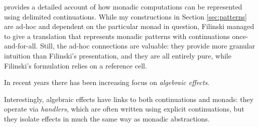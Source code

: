 \documentclass[acmsmall, nonacm, screen]{acmart}
\newif\ifdraft\drafttrue
\newcommand{\outline}[1]{
  \ifdraft
  {\color{red}{#1}}
  \fi
}
\begin{document}
\citet{filinski1994representing} provides a detailed account of how monadic computations can be
represented using delimited continuations. While my constructions in Section \ref{sec:patterns}
are ad-hoc and dependent on the particular monad in question, Filinski managed to give a
translation that represents monadic patterns with continuations once-and-for-all. Still, the
ad-hoc connections are valuable: they provide more granular intuition than Filinski's
presentation, and they are all entirely pure, while Filinski's formulation relies on a reference
cell.

In recent years there has been increasing focus on {\em algebraic effects}.\outline{cite}
Interestingly, algebraic effects have links to both continuations and monads: they operate via
{\em handlers}, which are often written using explicit continuations, but they isolate effects in
much the same way as monadic abstractions.

\outline{Better ending}



\end{document}
